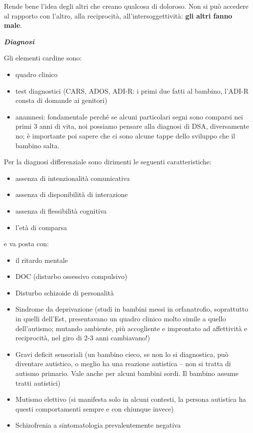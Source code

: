 \documentclass[]{article}
\begin{document}
Rende bene l'idea degli altri che creano qualcosa di doloroso. Non si
può accedere al rapporto con l'altro, alla reciprocità,
all'intersoggettività: \textbf{gli altri fanno male}.

\emph{\textbf{Diagnosi}}

Gli elementi cardine sono:

\begin{itemize}
\item
  quadro clinico
\item
  test diagnostici (CARS, ADOS, ADI-R: i primi due fatti al bambino,
  l'ADI-R consta di domande ai genitori)
\item
  anamnesi: fondamentale perché se alcuni particolari segni sono
  comparsi nei primi 3 anni di vita, noi possiamo pensare alla diagnosi
  di DSA, diversamente no; è importante poi sapere che ci sono alcune
  tappe dello sviluppo che il bambino salta.
\end{itemize}

Per la diagnosi differenziale sono dirimenti le seguenti
caratteristiche:

\begin{itemize}
\item
  assenza di intenzionalità comunicativa
\item
  assenza di disponibilità di interazione
\item
  assenza di flessibilità cognitiva
\item
  l'età di comparsa
\end{itemize}

e va posta con:

\begin{itemize}
\item
  il ritardo mentale
\item
  DOC (disturbo ossessivo compulsivo)
\item
  Disturbo schizoide di personalità
\item
  Sindrome da deprivazione (studi in bambini messi in orfanatrofio,
  soprattutto in quelli dell'Est, presentavano un quadro clinico molto
  simile a quello dell'autismo; mutando ambiente, più accogliente e
  improntato ad affettività e reciprocità, nel giro di 2-3 anni
  cambiavano!)
\item
  Gravi deficit sensoriali (un bambino cieco, se non lo si diagnostica,
  può diventare autistico, o meglio ha una reazione autistica -- non si
  tratta di autismo primario. Vale anche per alcuni bambini sordi. Il
  bambino assume tratti autistici)
\item
  Mutismo elettivo (si manifesta solo in alcuni contesti, la persona
  autistica ha questi comportamenti sempre e con chiunque invece)
\item
  Schizofrenia a sintomatologia prevalentemente negativa
\end{itemize}
\end{document}
